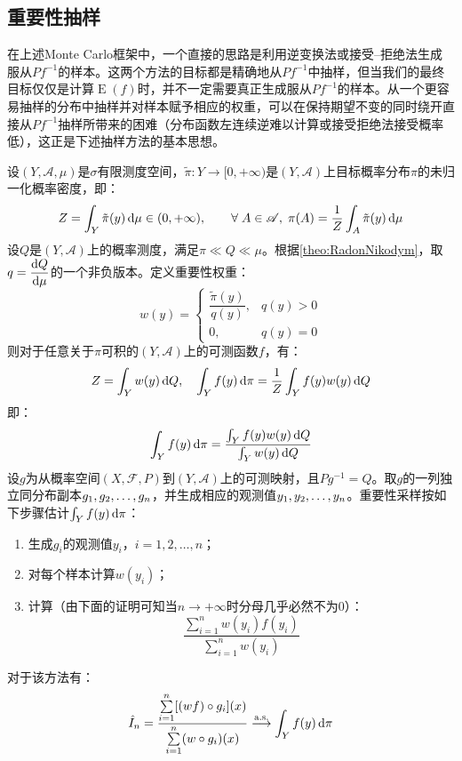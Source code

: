 \subsection{重要性抽样}
在上述Monte Carlo框架中，一个直接的思路是利用逆变换法或接受--拒绝法生成服从$Pf^{-1}$的样本。这两个方法的目标都是精确地从$Pf^{-1}$中抽样，但当我们的最终目标仅仅是计算$\operatorname{E}(f)$时，并不一定需要真正生成服从$Pf^{-1}$的样本。从一个更容易抽样的分布中抽样并对样本赋予相应的权重，可以在保持期望不变的同时绕开直接从$Pf^{-1}$抽样所带来的困难（分布函数左连续逆难以计算或接受拒绝法接受概率低），这正是下述抽样方法的基本思想。
\begin{method}
	设$(Y,\mathscr{A},\mu)$是$\sigma$有限测度空间，$\tilde{\pi}:Y\to[0,+\infty)$是$(Y,\mathscr{A})$上目标概率分布$\pi$的未归一化概率密度，即：
	\begin{equation*}
		Z=\int_Y\tilde{\pi}(y)\mathop{}\!\mathrm{d}\mu\in(0,+\infty),\qquad\forall\;A\in\mathscr{A},\;\pi(A)=\frac{1}{Z}\int_{A}\tilde{\pi}(y)\mathop{}\!\mathrm{d}\mu
	\end{equation*}
	设$Q$是$(Y,\mathscr{A})$上的概率测度，满足$\pi\ll Q\ll\mu$。根据\cref{theo:RadonNikodym}，取$q=\dfrac{\mathop{}\!\mathrm{d} Q}{\mathop{}\!\mathrm{d}\mu}$的一个非负版本。定义重要性权重：
	\begin{equation*}
		w(y)=
		\begin{cases}
			\dfrac{\tilde{\pi}(y)}{q(y)}, &q(y)>0 \\
			0, &q(y)=0
		\end{cases}
	\end{equation*}
	则对于任意关于$\pi$可积的$(Y,\mathscr{A})$上的可测函数$f$，有：
	\begin{equation*}
		Z=\int_{Y}w(y)\mathop{}\!\mathrm{d} Q,\quad\int_{Y}f(y)\mathop{}\!\mathrm{d}\pi=\frac{1}{Z}\int_{Y}f(y)w(y)\mathop{}\!\mathrm{d} Q
	\end{equation*}
	即：
	\begin{equation*}
		\int_{Y}f(y)\mathop{}\!\mathrm{d}\pi=\frac{\int_{Y}f(y)w(y)\mathop{}\!\mathrm{d} Q}{\int_{Y}w(y)\mathop{}\!\mathrm{d} Q}
	\end{equation*}
	设$g$为从概率空间$(X,\mathscr{F},P)$到$(Y,\mathscr{A})$上的可测映射，且$Pg^{-1}=Q$。取$g$的一列独立同分布副本$g_1, g_2, \dots, g_{n}$，并生成相应的观测值$y_1, y_2, \dots, y_{n}$。重要性采样按如下步骤估计$\int_{Y}f(y)\mathop{}\!\mathrm{d}\pi$：
	\begin{enumerate}
		\item 生成$g_i$的观测值$y_i$，$i=1,2,\dots,n$；
		\item 对每个样本计算$w(y_i)$；
		\item 计算（由下面的证明可知当$n\to+\infty$时分母几乎必然不为$0$）：
		\begin{equation*}
			\frac{\sum\limits_{i=1}^{n}w(y_i)f(y_i)}{\sum\limits_{i=1}^{n}w(y_i)}
		\end{equation*}
	\end{enumerate}
	对于该方法有：
	\begin{equation*}
		\hat{I}_n=\frac{\sum\limits_{i=1}^{n}[(wf)\circ g_i](x)}{\sum\limits_{i=1}^{n}(w\circ g_i)(x)}\overset{\text{a.s.}}{\longrightarrow}\int_{Y}f(y)\mathop{}\!\mathrm{d}\pi
	\end{equation*}
\end{method}
